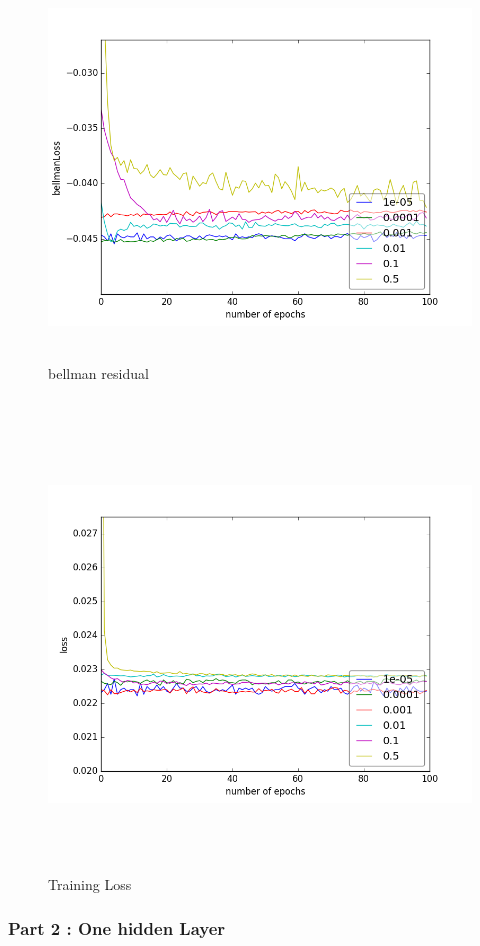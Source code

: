 \documentclass{report}
\begin{document}
\begin{figure}[H]
    \begin{minipage}[c]{.49\linewidth}
        \centering
        \includegraphics[width = 0.7\linewidth]{plots/a3-1/bellmanLoss.png}
        \caption{bellman residual}
    \end{minipage}
    \hfill%
    \begin{minipage}[c]{.49\linewidth}
        \centering
        \includegraphics[width = 0.7\linewidth]{plots/a3-1/loss.png}
        \caption{Training Loss}
    \end{minipage}
\end{figure}

\subsubsection*{Part 2 : One hidden Layer}
\end{document}
